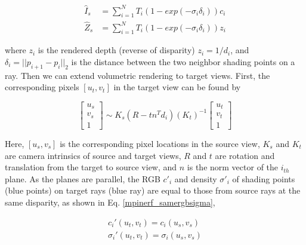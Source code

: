 {
\begin{equation}
\begin{aligned}
    \hat{I}_s &= \sum_{i=1}^{N}T_{i}(1-exp(-\sigma_{i}\delta_{i}))c_{i} \\
    \hat{Z}_s &= \sum_{i=1}^{N}T_{i}(1-exp(-\sigma_{i}\delta_{i}))z_{i}
\end{aligned}
\label{eq:combined}
\end{equation}
}

\noindent where $z_i$ is the rendered depth (reverse of disparity) $z_i = 1/d_i$, and $\delta_i = ||p_{i+1} - p_i||_2$ is the distance between the two neighbor shading points on a ray. Then we can extend volumetric rendering to target views. First, the corresponding pixels $[u_t, v_t]$ in the target view can be found by 

\begin{equation}
    \begin{bmatrix}
        u_{s} \\
        v_{s} \\
        1
    \end{bmatrix}
    \sim K_{s}(R-tn^{T}d_{i})(K_{t})^{-1}
    \begin{bmatrix}
        u_{t} \\
        v_{t} \\
        1
    \end{bmatrix}
\end{equation}

Here, $[u_s, v_s]$ is the corresponding pixel locations in the source view, $K_s$ and $K_t$ are camera intrinsics of source and target views, $R$ and $t$ are rotation and translation from the target to source view, and $n$ is the norm vector of the $i_{th}$ plane. As the planes are parallel, the RGB $c'_i$ and density $\sigma'_i$ of shading points (blue points) on target rays (blue ray) are equal to those from source rays at the same disparity, as shown in Eq. \ref{mpinerf_samergbsigma},

{
\begin{equation}
\begin{aligned}
    c_{i}'(u_{t}, v_{t}) = c_{i}(u_{s}, v_{s}) \\
    \sigma_{i}'(u_{t}, v_{t}) = \sigma_{i}(u_{s}, v_{s})
\end{aligned}
\label{mpinerf_samergbsigma}
\end{equation}
}

